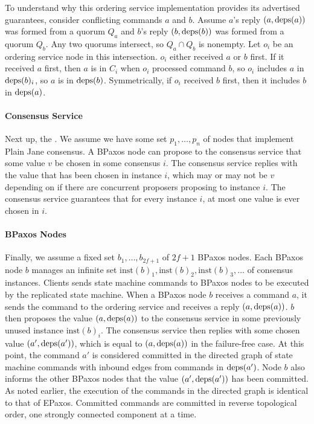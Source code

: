 \documentclass{mwhittaker}
\begin{document}
To understand why this ordering service implementation provides its advertised
guarantees, consider conflicting commands $a$ and $b$. Assume $a$'s reply $(a,
\text{deps}(a))$ was formed from a quorum $Q_a$ and $b$'s reply $(b, \text{deps}(b))$ was
formed from a quorum $Q_b$. Any two quorums intersect, so $Q_a \cap Q_b$ is
nonempty. Let $o_i$ be an ordering service node in this intersection. $o_i$
either received $a$ or $b$ first. If it received $a$ first, then $a$ is in
$C_i$ when $o_i$ processed command $b$, so $o_i$ includes $a$ in $\text{deps}(b)_i$,
so $a$ is in $\text{deps}(b)$. Symmetrically, if $o_i$ received $b$ first, then it
includes $b$ in $\text{deps}(a)$.

\paragraph{Consensus Service}
Next up, the . We assume we have some set $p_1,
\ldots, p_n$ of nodes that implement Plain Jane consensus. A BPaxos node can
propose to the consensus service that some value $v$ be chosen in some
consensus  $i$. The consensus service replies with the value
that has been chosen in instance $i$, which may or may not be $v$ depending on
if there are concurrent proposers proposing to instance $i$. The consensus
service guarantees that for every instance $i$, at most one value is ever
chosen in $i$.

\paragraph{BPaxos Nodes}
\newcommand{\instance}[1]{\text{inst}(#1)}

Finally, we assume a fixed set $b_1, \ldots, b_{2f+1}$ of $2f + 1$ BPaxos
nodes. Each BPaxos node $b$ manages an infinite set $\instance{b}_1,
\instance{b}_2, \instance{b}_3, \ldots$ of consensus instances.
%
Clients sends state machine commands to BPaxos nodes to be executed by the
replicated state machine. When a BPaxos node $b$ receives a command $a$, it
sends the command to the ordering service and receives a reply $(a, \text{deps}(a))$.
$b$ then proposes the value $(a, \text{deps}(a))$ to the consensus service in some
previously unused instance $\instance{b}_i$. The consensus service then replies
with some chosen value $(a', \text{deps}(a'))$, which is equal to $(a, \text{deps}(a))$ in
the failure-free case. At this point, the command $a'$ is considered committed
in the directed graph of state machine commands with inbound edges from
commands in $\text{deps}(a')$. Node $b$ also informs the other BPaxos nodes that the
value $(a', \text{deps}(a'))$ has been committed. As noted earlier, the execution of
the commands in the directed graph is identical to that of EPaxos. Committed
commands are committed in reverse topological order, one strongly connected
component at a time.
\end{document}
